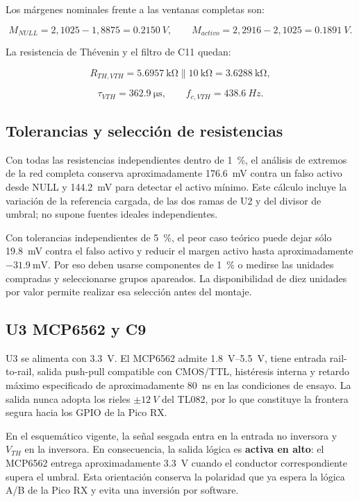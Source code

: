 \documentclass[11pt,a4paper]{article}
\begin{document}
Los márgenes nominales frente a las ventanas completas son:

\[
 M_{NULL}=2{,}1025-1{,}8875=\SI{0.2150}{V},
\qquad
 M_{activo}=2{,}2916-2{,}1025=\SI{0.1891}{V}.
\]

La resistencia de Thévenin y el filtro de C11 quedan:

\[
 R_{TH,VTH}=\SI{5.6957}{\kilo\ohm}\parallel\SI{10}{\kilo\ohm}
 =\SI{3.6288}{\kilo\ohm},
\]

\[
 \tau_{VTH}=\SI{362.9}{\micro\second},\qquad
 f_{c,VTH}=\SI{438.6}{Hz}.
\]

\subsection{Tolerancias y selección de resistencias}

Con todas las resistencias independientes dentro de \SI{1}{\percent}, el
análisis de extremos de la red completa conserva aproximadamente
\SI{176.6}{\milli\volt} contra un falso activo desde NULL y
\SI{144.2}{\milli\volt} para detectar el activo mínimo. Este cálculo incluye la
variación de la referencia cargada, de las dos ramas de U2 y del divisor de
umbral; no supone fuentes ideales independientes.

Con tolerancias independientes de \SI{5}{\percent}, el peor caso teórico puede
dejar sólo \SI{19.8}{\milli\volt} contra el falso activo y reducir el margen
activo hasta aproximadamente $-\SI{31.9}{\milli\volt}$. Por eso deben usarse
componentes de \SI{1}{\percent} o medirse las unidades compradas y
seleccionarse grupos apareados. La disponibilidad de diez unidades por valor
permite realizar esa selección antes del montaje.

\subsection{U3 MCP6562 y C9}

U3 se alimenta con \SI{3.3}{V}. El MCP6562 admite \SIrange{1.8}{5.5}{V}, tiene
entrada rail-to-rail, salida push-pull compatible con CMOS/TTL, histéresis
interna y retardo máximo especificado de aproximadamente \SI{80}{ns} en las
condiciones de ensayo. La salida nunca adopta los rieles $\pm\SI{12}{V}$ del
TL082, por lo que constituye la frontera segura hacia los GPIO de la Pico RX.

En el esquemático vigente, la señal sesgada entra en la entrada no inversora y
$V_{TH}$ en la inversora. En consecuencia, la salida lógica es
\textbf{activa en alto}: el MCP6562 entrega aproximadamente \SI{3.3}{V} cuando
el conductor correspondiente supera el umbral. Esta orientación conserva la
polaridad que ya espera la lógica A/B de la Pico RX y evita una inversión por
software.
\end{document}
